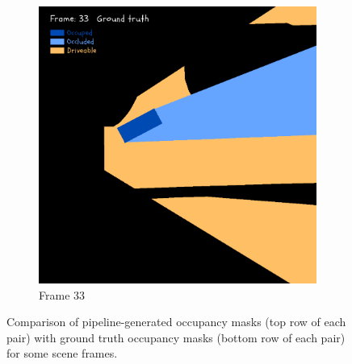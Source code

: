 \begin{figure}[htbp]
\begin{subfigure}[b]{0.19\linewidth}
        \vspace{0.5em}
        \includegraphics[width=\linewidth]{images/experiments/occ2_masks/gt_occ_mask_colored_33.png}
        \caption{Frame 33}
        \label{subfig:occ_masks_frame33}
    \end{subfigure}
    \caption{Comparison of pipeline-generated occupancy masks (top row of each pair) with ground truth occupancy masks (bottom row of each pair) for some scene frames.}
    \label{fig:occupancy_masks_comparison}
\end{figure}


